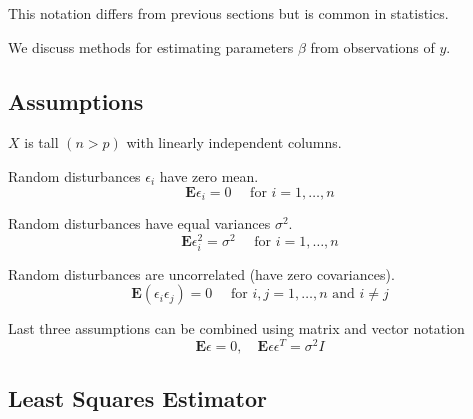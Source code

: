 \begin{remark}
    This notation differs from previous sections but is common in statistics.
\end{remark}

We discuss methods for estimating parameters $ \beta $ from observations of $ y $.

\subsection{Assumptions}

\begin{proposition}
    $ X $ is tall $ (n>p) $ with linearly independent columns.
\end{proposition}

\begin{proposition}
    Random disturbances $ \epsilon_{i} $ have zero mean.
\begin{equation}
\mathbf{E} \epsilon_{i}=0 \quad \text { for } i=1, \ldots, n
\end{equation}
\end{proposition}

\begin{proposition}
    Random disturbances have equal variances $ \sigma^{2} $.
\begin{equation}
\mathbf{E} \epsilon_{i}^{2}=\sigma^{2} \quad \text { for } i=1, \ldots, n
\end{equation}
\end{proposition}

\begin{proposition}
    Random disturbances are uncorrelated (have zero covariances).
\begin{equation}
\mathbf{E}\left(\epsilon_{i} \epsilon_{j}\right)=0 \quad \text { for } i, j=1, \ldots, n \text { and } i \neq j
\end{equation}
\end{proposition}

\begin{theorem}
    Last three assumptions can be combined using matrix and vector notation
\begin{equation}
\mathbf{E} \epsilon=0, \quad \mathbf{E} \epsilon \epsilon^{T}=\sigma^{2} I
\end{equation}
\end{theorem}


\subsection{Least Squares Estimator}

